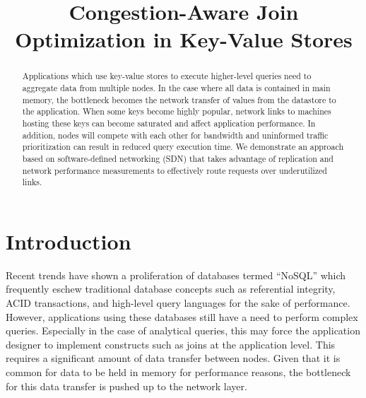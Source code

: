 \documentclass{sig-alternate-2013}
\begin{document}
\hypersetup{pdftitle=Congestion-Aware Join Optimization in Key-Value Stores}

\title{Congestion-Aware Join Optimization in Key-Value Stores}

\author{
}

\maketitle

\begin{abstract}
Applications which use key-value stores to execute higher-level queries need to aggregate data from multiple nodes.
In the case where all data is contained in main memory, the bottleneck becomes the network transfer of values from the datastore to the application.
When some keys become highly popular, network links to machines hosting these keys can become saturated and affect application performance.
In addition, nodes will compete with each other for bandwidth and uninformed traffic prioritization can result in reduced query execution time.
We demonstrate an approach based on software-defined networking (SDN) that takes advantage of replication and network performance measurements to effectively route requests over underutilized links.
\end{abstract}

\section{Introduction}

Recent trends have shown a proliferation of databases termed ``NoSQL'' which frequently eschew traditional database concepts such as referential integrity, ACID transactions, and high-level query languages for the sake of performance.
However, applications using these databases still have a need to perform complex queries.
Especially in the case of analytical queries, this may force the application designer to implement constructs such as joins at the application level.
This requires a significant amount of data transfer between nodes.
Given that it is common for data to be held in memory for performance reasons, the bottleneck for this data transfer is pushed up to the network layer.
\end{document}
